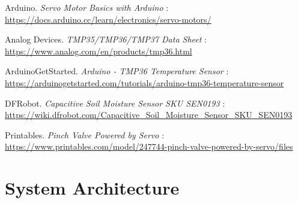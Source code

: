 \documentclass[a4paper,11pt]{article}
\begin{document}
\newpage
\begin{thebibliography}{9}

Arduino. \textit{Servo Motor Basics with Arduino} : \\
\url{https://docs.arduino.cc/learn/electronics/servo-motors/}

Analog Devices. \textit{TMP35/TMP36/TMP37 Data Sheet} : \\
\url{https://www.analog.com/en/products/tmp36.html} 

ArduinoGetStarted. \textit{Arduino - TMP36 Temperature Sensor} : \\
\url{https://arduinogetstarted.com/tutorials/arduino-tmp36-temperature-sensor}

DFRobot. \textit{Capacitive Soil Moisture Sensor SKU SEN0193} : \\
\url{https://wiki.dfrobot.com/Capacitive_Soil_Moisture_Sensor_SKU_SEN0193}

Printables. \textit{Pinch Valve Powered by Servo} : \\
\url{https://www.printables.com/model/247744-pinch-valve-powered-by-servo/files}

\end{thebibliography}

\newpage
\appendix

\section{System Architecture}

\begin{table}[H]
    \centering
    \renewcommand{\arraystretch}{1.5} 
    \caption{Component Order Summary}
    \label{tab:component_order}
\end{table}
\end{document}
